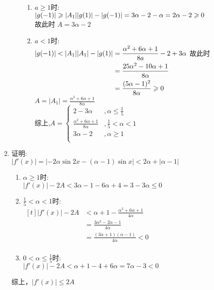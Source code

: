 \documentclass[class=ctexart,crop=false]{standalone}
\begin{document}
\begin{enumerate}[label=(\Roman*)]
\begin{enumerate}[label=(\roman*)]
            \begin{enumerate}[label=(\arabic*)]
                \item $a\geqslant 1$时:\\
                $|g(-1)|\geqslant|A_1|\\
                |g(1)|-|g(-1)|=3\alpha-2-\alpha=2\alpha-2\geqslant0$\\
                故此时 $A=3\alpha-2$                
                \item $a < 1$时:\\
                    $|g(-1)|<|A_1|\\
                    \begin{aligned}[t]
                        |A_1|-|g(1)|&=\frac{\alpha^2+6\alpha+1}{8a}-2+3\alpha\\
                            &=\frac{25\alpha^2-10\alpha+1}{8\alpha}\\
                            &=\frac{(5\alpha-1)^2}{8\alpha}\geqslant 0\\
                    \end{aligned}\\$
                故此时 $A=|A_1|=\frac{\alpha^2+6\alpha+1}{8\alpha}$\\
                综上,$A=
                    \begin{cases}
                        2-3\alpha &, \alpha \leqslant \frac{1}{5}\\
                        \frac{\alpha^2+6\alpha+1}{8\alpha} &,\frac{1}{5}<\alpha<1\\
                        3\alpha-2 &,\alpha \geqslant 1\\
                    \end{cases}$
            \end{enumerate}
        \end{enumerate}
    \item  证明:\\
        $|f'(x)|=|-2\alpha \sin 2x -(\alpha -1)\sin x|<2\alpha+|\alpha-1|$
        \begin{enumerate}
            \item $\alpha \geqslant 1$时:\\
                $|f'(x)|-2A<3\alpha-1-6\alpha+4=3-3\alpha\leqslant 0$
            \item $\frac{1}{5}< \alpha<1$时:\\
            $\begin{aligned}[t]
                |f'(x)|-2A&<\alpha+1-\frac{\alpha^2+6\alpha+1}{4\alpha}\\
                &=\frac{3\alpha^2-2\alpha-1}{4\alpha}\\
                &=\frac{(3\alpha+1)(\alpha-1)}{4\alpha}<0\\
            \end{aligned}$\\
            \item $0<\alpha\leqslant \frac{1}{5}$时:\\
            $|f'(x)|-2A<\alpha+1-4+6\alpha=7\alpha-3<0$
        \end{enumerate}
        综上，$|f'(x)|\leqslant 2A$
\end{enumerate}
\end{document}
